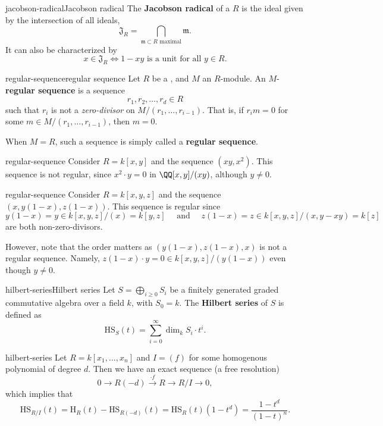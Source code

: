 \begin{topic}{jacobson-radical}{Jacobson radical}
     The \textbf{Jacobson radical} of a  $R$ is the ideal given by the intersection of all  ideals,
     \[ \mathfrak{J}_R = \bigcap_{\mathfrak{m} \subset R \text{ maximal}} \mathfrak{m} . \]
     It can also be characterized by
     \[ x \in \mathfrak{J}_R \iff 1 - xy \text{ is a unit for all } y \in R . \]
\end{topic}

\begin{topic}{regular-sequence}{regular sequence}
    Let $R$ be a , and $M$ an $R$-module. An $M$-\textbf{regular sequence} is a sequence
    \[ r_1, r_2, \ldots, r_d \in R \]
    such that $r_i$ is not a \textit{zero-divisor} on $M/(r_1, \ldots, r_{i - 1})$. That is, if $r_i m = 0$ for some $m \in M / (r_1, \ldots, r_{i - 1})$, then $m = 0$.
    
    When $M = R$, such a sequence is simply called a \textbf{regular sequence}.
\end{topic}

\begin{example}{regular-sequence}
    Consider $R = k[x, y]$ and the sequence $(xy, x^2)$. This sequence is not regular, since $x^2 \cdot y = 0$ in $\QQ[x, y] / (xy)$, although $y \ne 0$.
\end{example}

\begin{example}{regular-sequence}
    Consider $R = k[x, y, z]$ and the sequence $(x, y(1 - x), z(1 - x))$. This sequence is regular since
    \[ y(1 - x) = y \in k[x, y, z]/(x) = k[y, z] \quad \text{ and } \quad z(1 - x) = z \in k[x, y, z]/(x, y - xy) = k[z] \]
    are both non-zero-divisors.
    
    However, note that the order matters as $(y(1 - x), z(1 - x), x)$ is not a regular sequence. Namely, $z(1 - x) \cdot y = 0 \in k[x, y, z] / (y(1 - x))$ even though $y \ne 0$.
\end{example}

\begin{topic}{hilbert-series}{Hilbert series}
    Let $S = \bigoplus_{i \ge 0} S_i$ be a finitely generated graded commutative algebra over a field $k$, with $S_0 = k$. The \textbf{Hilbert series} of $S$ is defined as
    \[ \text{HS}_S(t) = \sum_{i = 0}^{\infty} \dim_k S_i \cdot t^i . \]
\end{topic}

\begin{example}{hilbert-series}
    Let $R = k[x_1, \ldots, x_n]$ and $I = (f)$ for some homogenous polynomial of degree $d$. Then we have an exact sequence (a free resolution)
    \[ 0 \to R(-d) \xrightarrow{\cdot f} R \to R / I \to 0 , \]
    which implies that
    \[ \text{HS}_{R/I}(t) = \text{H}_R(t) - \text{HS}_{R(-d)}(t) = \text{HS}_R(t) (1 - t^d) = \frac{1 - t^d}{(1 - t)^n}. \]
\end{example}

